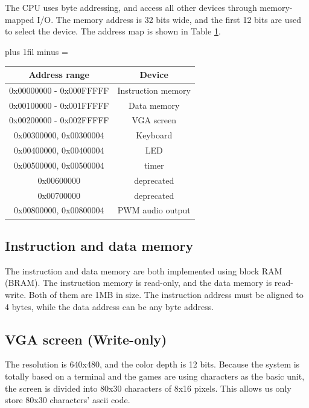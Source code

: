 \documentclass[
	a4paper, %
	11pt, %
]{CSUniSchoolLabReport}
\def\Scentering{\leftskip=0pt plus 1fil minus \Rmargin
                \rightskip=\leftskip}
\begin{document}
The CPU uses byte addressing, and access all other devices through memory-mapped I/O. The memory address is 32 bits wide, and the first 12 bits are used to select the device. The address map is shown in Table \ref{tab:address-map}.
\begin{table}[h]
    \Scentering
    \begin{tabular}{|c|c|}
        \hline
        Address range           & Device             \\
        \hline
        0x00000000 - 0x000FFFFF & Instruction memory \\
        \hline
        0x00100000 - 0x001FFFFF & Data memory        \\
        \hline
        0x00200000 - 0x002FFFFF & VGA screen         \\
        \hline
        0x00300000, 0x00300004  & Keyboard           \\
        \hline
        0x00400000, 0x00400004  & LED                \\
        \hline
        0x00500000, 0x00500004  & timer              \\
        \hline
        0x00600000              & deprecated         \\
        \hline
        0x00700000              & deprecated         \\
        \hline
        0x00800000, 0x00800004  & PWM audio output   \\
        \hline
    \end{tabular}
    \label{tab:address-map}
\end{table}

\subsection{Instruction and data memory}
The instruction and data memory are both implemented using block RAM (BRAM). The instruction memory is read-only, and the data memory is read-write. Both of them are 1MB in size. The instruction address must be aligned to 4 bytes, while the data address can be any byte address.
\subsection{VGA screen (Write-only)}
The resolution is 640x480, and the color depth is 12 bits. Because the system is totally based on a terminal and the games are using characters as the basic unit, the screen is divided into 80x30 characters of 8x16 pixels. This allows us only store 80x30 characters' ascii code.
\end{document}
